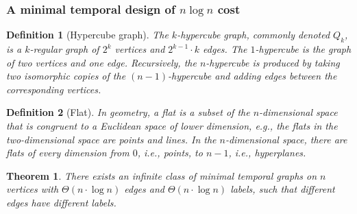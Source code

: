 \documentclass[a4paper,UKenglish]{article}
\newtheorem{theorem}{Theorem}
\newtheorem{definition}{Definition}
\begin{document}
\subsubsection{A minimal temporal design of \texorpdfstring{$n \log{n}$}{nlogn} cost}\label{sec:nlogn_minimal}

\begin{definition}[Hypercube graph]
The $k$-hypercube graph, commonly denoted $Q_k$, is a $k$-regular graph of $2^k$ vertices and $2^{k-1} \cdot k$ edges. The $1$-hypercube is the graph of two vertices and one edge. Recursively, the $n$-hypercube is produced by taking two isomorphic copies of the $(n-1)$-hypercube and adding edges between the corresponding vertices.
\end{definition}

\begin{definition}[Flat]
In geometry, a \emph{flat} is a subset of the $n$-dimensional space that is congruent to a Euclidean space of lower dimension, e.g., the flats in the two-dimensional space are points and lines. In the $n$-dimensional space, there are flats of every dimension from $0$, i.e., points, to $n-1$, i.e., hyperplanes.
\end{definition}
\begin{theorem}
There exists an infinite class of minimal temporal graphs on $n$ vertices with $\Theta(n\cdot \log{n})$ edges and $\Theta(n\cdot \log{n})$ labels, such that different edges have different labels.
\end{theorem} 
\end{document}
